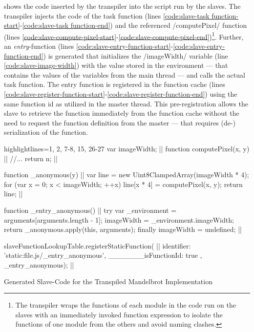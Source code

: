  shows the code inserted by the transpiler into the script run by the slaves. The transpiler injects the code of the task function (lines \ref{code:slave-task function-start}-\ref{code:slave-task function-end}) and the referenced \javascriptinline/computePixel/ function (lines \ref{code:slave-compute-pixel-start}-\ref{code:slave-compute-pixel-end})\footnote{The transpiler wraps the functions of each module in the code run on the slaves with an immediately invoked function expression to isolate the functions of one module from the others and avoid naming clashes.}. Further, an \textit{entry}-function (lines \ref{code:slave-entry-function-start}-\ref{code:slave-entry-function-end}) is generated that initializes the \javascriptinline/imageWidth/ variable (line \ref{code:slave-image-width}) with the value stored in the environment --- that contains the values of the variables from the main thread --- and calls the actual task function. The entry function is registered in the function cache (lines \ref{code:slave-register-function-start}-\ref{code:slave-register-function-end}) using the same function id as utilized in the master thread. This pre-registration allows the slave to retrieve the function immediately from the function cache without the need to request the function definition from the master --- that requires (de-) serialization of the function.

\begin{listing}
\begin{javascriptcode*}{highlightlines={1, 2, 7-8, 15, 26-27}}
var imageWidth; |$\label{code:slave-image-width}$|
function computePixel(x, y) { |$\label{code:slave-compute-pixel-start}$|
	//...
	return n;
}|$\label{code:slave-compute-pixel-end}$|

function _anonymous(y) { |$\label{code:slave-task function-start}$|
	var line = new Uint8ClampedArray(imageWidth * 4);
	for (var x = 0; x < imageWidth; ++x) {
		line[x * 4] = computePixel(x, y);
	}
	return line;
}|$\label{code:slave-task function-end}$|

function _entry_anonymous() { |$\label{code:slave-entry-function-start}$|
	try {
		var _environment = arguments[arguments.length - 1];
		imageWidth = _environment.imageWidth;
		return _anonymous.apply(this, arguments);
	} finally {
		imageWidth = undefined;
	}
}|$\label{code:slave-entry-function-end}$|

slaveFunctionLookupTable.registerStaticFunction({ |$\label{code:slave-register-function-start}$|
	identifier: 'static:file.js/_entry_anonymous',
	_______isFunctionId: true
}, _entry_anonymous); |$\label{code:slave-register-function-end}$|
\end{javascriptcode*}
\caption{Generated Slave-Code for the Transpiled Mandelbrot Implementation}
\label{fig:transpiled-mandelbrot-slave}
\end{listing}

